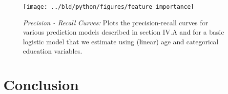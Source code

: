 \documentclass[11pt, a4paper, leqno]{article}
\begin{document}
\begin{figure}[H]

    \centering
    \texttt{[image: ../bld/python/figures/feature\_importance]}

    \caption{\emph{Precision - Recall Curves:} Plots the precision-recall curves for various
    prediction models described in section IV.A and for a basic logistic model that we
    estimate using (linear) age and categorical education variables. }
    \label{fig:feature_importance}

\end{figure}


\section{Conclusion}
\label{sec:conclusion}

\printbibliography
{}



\end{document}
